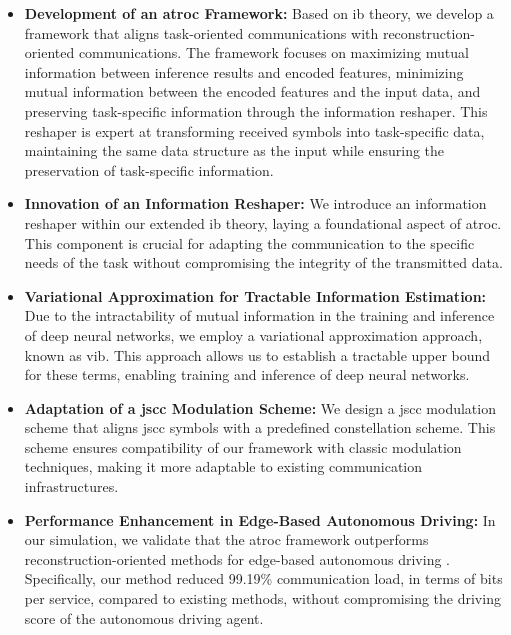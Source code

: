 \begin{itemize}
    \item \textbf{Development of an \gls{atroc} Framework:} Based on \gls{ib} theory, we develop a framework that aligns task-oriented communications with reconstruction-oriented communications. The framework focuses on maximizing mutual information between inference results and encoded features, minimizing mutual information between the encoded features and the input data, and preserving task-specific information through the information reshaper. This reshaper is expert at transforming received symbols into task-specific data, maintaining the same data structure as the input while ensuring the preservation of task-specific information.

    \item \textbf{Innovation of an Information Reshaper:} We introduce an information reshaper within our extended \gls{ib} theory, laying a foundational aspect of \gls{atroc}. This component is crucial for adapting the communication to the specific needs of the task without compromising the integrity of the transmitted data.

    \item \textbf{Variational Approximation for Tractable Information Estimation:} Due to the intractability of mutual information in the training and inference of deep neural networks, we employ a variational approximation approach, known as \gls{vib}. This approach allows us to establish a tractable upper bound for these terms, enabling training and inference of deep neural networks.

    \item \textbf{Adaptation of a \gls{jscc} Modulation Scheme:} We design a \gls{jscc} modulation scheme that aligns \gls{jscc} symbols with a predefined constellation scheme. This scheme ensures compatibility of our framework with classic modulation techniques, making it more adaptable to existing communication infrastructures.

    \item \textbf{Performance Enhancement in Edge-Based Autonomous Driving:} In our simulation, we validate that the \gls{atroc} framework outperforms reconstruction-oriented methods for edge-based autonomous driving \cite{Wu_2022_TgC}. 
    Specifically, our method reduced 99.19\% communication load, in terms of bits per service, compared to existing methods, without compromising the driving score of the autonomous driving agent.
\end{itemize}

